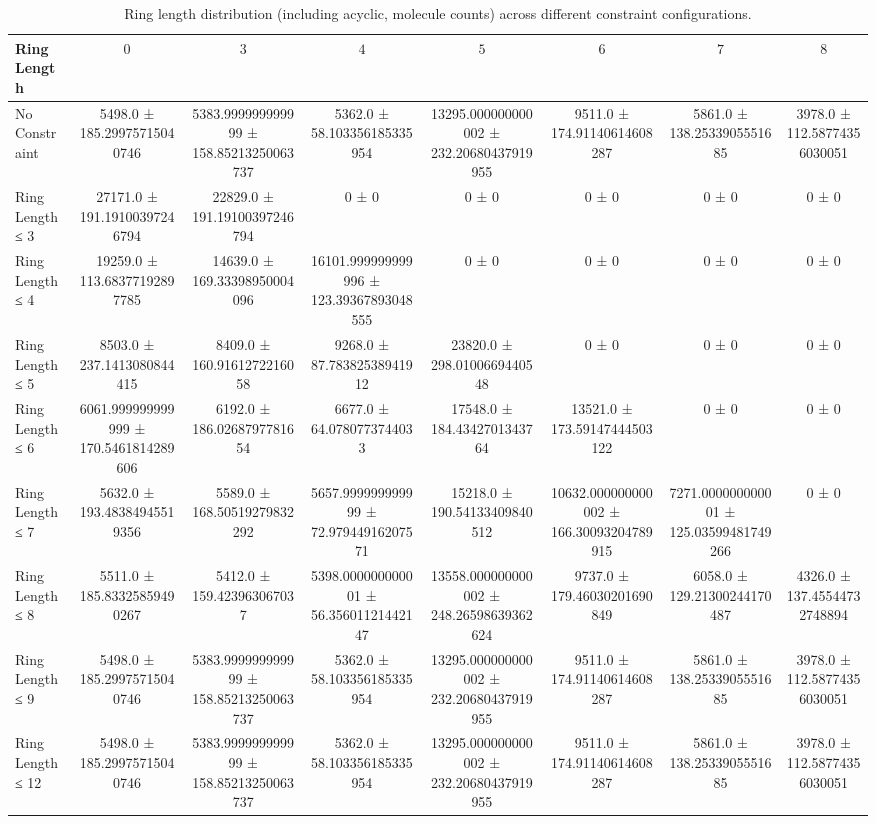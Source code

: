 \begin{table}[H]
    \centering
    \begin{tabular}{l c c c c c c c}
        \toprule
        \textbf{Ring Length} & $0$ & $3$ & $4$ & $5$ & $6$ & $7$ & $8$ \\
        \midrule
        No Constraint & 5498.0 ± 185.29975715040746 & 5383.999999999999 ± 158.85213250063737 & 5362.0 ± 58.103356185335954 & 13295.000000000002 ± 232.20680437919955 & 9511.0 ± 174.91140614608287 & 5861.0 ± 138.2533905551685 & 3978.0 ± 112.58774356030051 \\
        Ring Length ≤ 3 & 27171.0 ± 191.19100397246794 & 22829.0 ± 191.19100397246794 & 0 ± 0 & 0 ± 0 & 0 ± 0 & 0 ± 0 & 0 ± 0 \\
        Ring Length ≤ 4 & 19259.0 ± 113.68377192897785 & 14639.0 ± 169.33398950004096 & 16101.999999999996 ± 123.39367893048555 & 0 ± 0 & 0 ± 0 & 0 ± 0 & 0 ± 0 \\
        Ring Length ≤ 5 & 8503.0 ± 237.1413080844415 & 8409.0 ± 160.9161272216058 & 9268.0 ± 87.78382538941912 & 23820.0 ± 298.0100669440548 & 0 ± 0 & 0 ± 0 & 0 ± 0 \\
        Ring Length ≤ 6 & 6061.999999999999 ± 170.5461814289606 & 6192.0 ± 186.0268797781654 & 6677.0 ± 64.0780773744033 & 17548.0 ± 184.4342701343764 & 13521.0 ± 173.59147444503122 & 0 ± 0 & 0 ± 0 \\
        Ring Length ≤ 7 & 5632.0 ± 193.48384945519356 & 5589.0 ± 168.50519279832292 & 5657.999999999999 ± 72.97944916207571 & 15218.0 ± 190.54133409840512 & 10632.000000000002 ± 166.30093204789915 & 7271.000000000001 ± 125.03599481749266 & 0 ± 0 \\
        Ring Length ≤ 8 & 5511.0 ± 185.83325859490267 & 5412.0 ± 159.423963067037 & 5398.000000000001 ± 56.35601121442147 & 13558.000000000002 ± 248.26598639362624 & 9737.0 ± 179.46030201690849 & 6058.0 ± 129.21300244170487 & 4326.0 ± 137.45544732748894 \\
        Ring Length ≤ 9 & 5498.0 ± 185.29975715040746 & 5383.999999999999 ± 158.85213250063737 & 5362.0 ± 58.103356185335954 & 13295.000000000002 ± 232.20680437919955 & 9511.0 ± 174.91140614608287 & 5861.0 ± 138.2533905551685 & 3978.0 ± 112.58774356030051 \\
        Ring Length ≤ 12 & 5498.0 ± 185.29975715040746 & 5383.999999999999 ± 158.85213250063737 & 5362.0 ± 58.103356185335954 & 13295.000000000002 ± 232.20680437919955 & 9511.0 ± 174.91140614608287 & 5861.0 ± 138.2533905551685 & 3978.0 ± 112.58774356030051 \\
        \bottomrule
    \end{tabular}
    \caption{Ring length distribution (including acyclic, molecule counts) across different constraint configurations.}
\end{table}